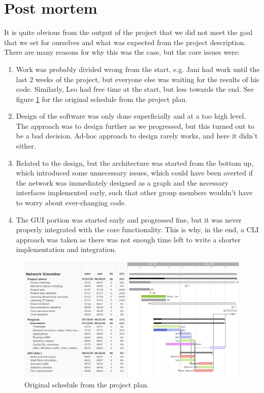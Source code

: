 \section{Post mortem}
It is quite obvious from the output of the project that we did not meet the goal that we set for ourselves and what was expected from the project description. There are many reasons for why this was the case, but the core issues were:
\begin{enumerate}
    \item Work was probably divided wrong from the start, e.g. Jani had work until the last 2 weeks of the project, but everyone else was waiting for the results of his code. Similarly, Leo had free time at the start, but less towards the end. See figure \ref{img:schedule} for the original schedule from the project plan.
    \item Design of the software was only done superficially and at a too high level. The approach was to design further as we progressed, but this turned out to be a bad decision. Ad-hoc approach to design rarely works, and here it didn't either.
    \item Related to the design, but the architecture was started from the bottom up, which introduced some unnecessary issues, which could have been averted if the network was immediately designed as a graph and the necessary interfaces implemented early, such that other group members wouldn't have to worry about ever-changing code.
    \item The GUI portion was started early and progressed fine, but it was never properly integrated with the core functionality. This is why, in the end, a CLI approach was taken as there was not enough time left to write a shorter implementation and integration. 
\end{enumerate}

\begin{figure}[!htbp]
\begin{center}
	\includegraphics[width=13cm]{originalschedule.png}
    \caption{Original schedule from the project plan.}
	\label{img:schedule}			%
\end{center}
\end{figure}

